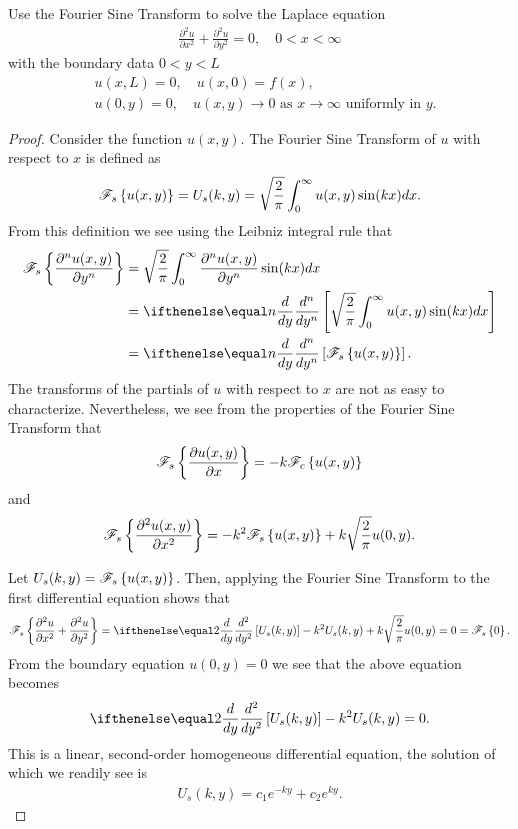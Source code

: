 \begin{problem}{7}
  Use the Fourier Sine Transform to solve the Laplace equation
  \begin{align*}
    \frac{\partial^2 u}{\partial x^2} + \frac{\partial^2 u}{\partial y^2}= 0 , \quad 0 < x < \infty
  \end{align*}
  with the boundary data $0 < y < L$
  \begin{align*}
    &u(x, L) = 0, \quad u(x, 0) = f(x), \\
    &u(0, y) = 0, \quad u(x, y) \to 0 \text{ as $x \to \infty$ uniformly in $y$}.
  \end{align*}
\end{problem}

\begin{proof}
  Consider the function $u(x, y)$. The Fourier Sine Transform
  of $u$ with respect to $x$ is defined as
  \begin{align*}
    \mathscr{F}_s\left\{ {u(x, y)} \right\} = U_s(k, y) = \sqrt{\frac{2}{\pi}} \int_{0}^{\infty}  u(x, y)  \sin (kx)dx.
  \end{align*}
  From this definition we see using the Leibniz integral rule that
  \begin{align*}
    \fouriersin{\frac{\partial^n u(x,y)}{\partial y^n}}
    &= \sqrt{\frac{2}{\pi}} \int_{0}^{\infty} \frac{\partial^n u(x,y)}{\partial y^n} \sin (kx)dx \\
    &= \der{y}{n}\left[\sqrt{\frac{2}{\pi}} \int_{0}^{\infty} u(x,y) \sin (kx)dx\right] \\
    &= \der{y}{n}\left[\fouriersin{u(x,y)}\right].
  \end{align*}
  The transforms of the partials of $u$ with respect to $x$ are not as easy to characterize. Nevertheless,
  we see from the properties of the Fourier Sine Transform that
  \begin{align*}
    \mathscr{F}_s\left\{ {\frac{\partial u(x,y)}{\partial x}} \right\} = -k \mathscr{F}_c\left\{ {u(x,y)} \right\}
  \end{align*}
  and
  \begin{align*}
    \mathscr{F}_s\left\{ {\frac{\partial^2 u(x,y)}{\partial x^2}} \right\} = -k^2 \mathscr{F}_s\left\{ {u(x,y)} \right\} + k\sqrt{\frac{2}{\pi}}u(0, y).
  \end{align*}

  Let $U_s(k, y) = \mathscr{F}_s\left\{ {u(x, y)} \right\}$. Then, applying the Fourier Sine Transform to
  the first differential equation shows that
  \begin{align*}
    \fouriersin{\frac{\partial^2 u}{\partial x^2} + \frac{\partial^2 u}{\partial y^2}} = \der{y}{2}\left[U_s(k, y)\right] - k^2 U_s(k,y)+k\sqrt{\frac{2}{\pi}}u(0,y) = 0 = \fouriersin{0}.
  \end{align*}
  From the boundary equation  $u(0, y) = 0$ we see that the above equation becomes
  \begin{align*}
    \der{y}{2}\left[U_s(k, y)\right] - k^2 U_s(k,y) = 0.
  \end{align*}
  This is a linear, second-order homogeneous differential equation, the solution
  of which we readily see is
  \begin{align}\label{homo}
    U_s(k, y) = c_1 e^{-ky} + c_2 e^{ky}.
  \end{align}


\end{proof}
